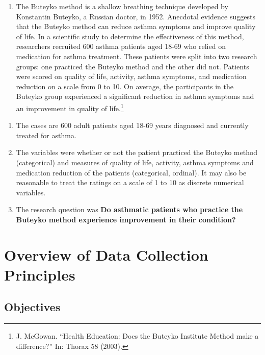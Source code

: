 \documentclass[
]{book}
\providecommand{\tightlist}{%
  \setlength{\itemsep}{0pt}\setlength{\parskip}{0pt}}
\begin{document}
\begin{enumerate}
\def\labelenumi{\arabic{enumi}.}
\setcounter{enumi}{1}
\tightlist
\item
  The Buteyko method is a shallow breathing technique developed by Konstantin Buteyko, a Russian doctor, in 1952. Anecdotal evidence suggests that the Buteyko method can reduce asthma symptoms and improve quality of life. In a scientific study to determine the effectiveness of this method, researchers recruited 600 asthma patients aged 18-69 who relied on medication for asthma treatment. These patients were split into two research groups: one practiced the Buteyko method and the other did not. Patients were scored on quality of life, activity, asthma symptoms, and medication reduction on a scale from 0 to 10. On average, the participants in the Buteyko group experienced a significant reduction in asthma symptoms and an improvement in quality of life.\footnote{J. McGowan. ``Health Education: Does the Buteyko Institute Method make a difference?'' In: Thorax 58 (2003).}
\end{enumerate}

\begin{enumerate}
\def\labelenumi{\roman{enumi}.}
\tightlist
\item
  The cases are 600 adult patients aged 18-69 years diagnosed and currently treated for asthma.\\
\item
  The variables were whether or not the patient practiced the Buteyko method (categorical) and measures of quality of life, activity, asthma symptoms and medication reduction of the patients (categorical, ordinal). It may also be reasonable to treat the ratings on a scale of 1 to 10 as discrete numerical variables.\\
\item
  The research question was \textbf{Do asthmatic patients who practice the Buteyko method experience improvement in their condition?}
\end{enumerate}

\hypertarget{ODCP}{%
\chapter{Overview of Data Collection Principles}\label{ODCP}}

\hypertarget{objectives-2}{%
\section{Objectives}\label{objectives-2}}
\end{document}
